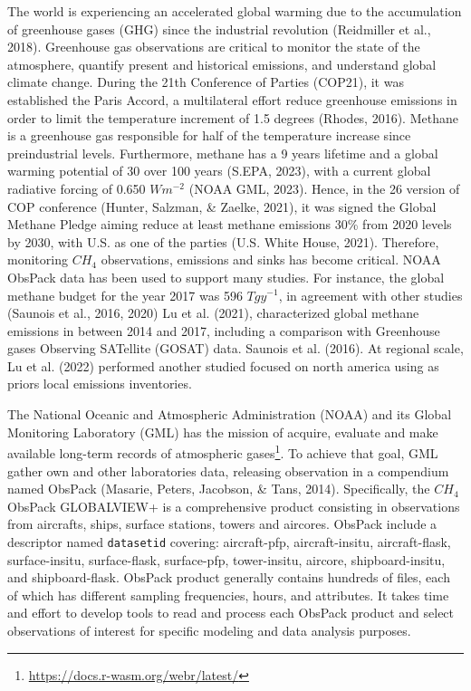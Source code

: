\documentclass[10pt,a4paper,onecolumn]{article}
\begin{document}
The world is experiencing an accelerated global warming due to the
accumulation of greenhouse gases (GHG) since the industrial revolution
(Reidmiller et al., 2018). Greenhouse gas observations are critical to
monitor the state of the atmosphere, quantify present and historical
emissions, and understand global climate change. During the 21th
Conference of Parties (COP21), it was established the Paris Accord, a
multilateral effort reduce greenhouse emissions in order to limit the
temperature increment of 1.5 degrees (Rhodes, 2016). Methane is a
greenhouse gas responsible for half of the temperature increase since
preindustrial levels. Furthermore, methane has a 9 years lifetime and a
global warming potential of 30 over 100 years (S.EPA, 2023), with a
current global radiative forcing of 0.650 \(Wm^{-2}\) (NOAA GML, 2023).
Hence, in the 26 version of COP conference (Hunter, Salzman, \& Zaelke,
2021), it was signed the Global Methane Pledge aiming reduce at least
methane emissions 30\% from 2020 levels by 2030, with U.S. as one of the
parties (U.S. White House, 2021). Therefore, monitoring \(CH_4\)
observations, emissions and sinks has become critical. NOAA ObsPack data
has been used to support many studies. For instance, the global methane
budget for the year 2017 was 596 \(Tgy^{-1}\), in agreement with other
studies (Saunois et al., 2016, 2020) Lu et al. (2021), characterized
global methane emissions in between 2014 and 2017, including a
comparison with Greenhouse gases Observing SATellite (GOSAT) data.
Saunois et al. (2016). At regional scale, Lu et al. (2022) performed
another studied focused on north america using as priors local emissions
inventories.

The National Oceanic and Atmospheric Administration (NOAA) and its
Global Monitoring Laboratory (GML) has the mission of acquire, evaluate
and make available long-term records of atmospheric gases\footnote{\url{https://docs.r-wasm.org/webr/latest/}}.
To achieve that goal, GML gather own and other laboratories data,
releasing observation in a compendium named ObsPack (Masarie, Peters,
Jacobson, \& Tans, 2014). Specifically, the \(CH_4\) ObsPack GLOBALVIEW+
is a comprehensive product consisting in observations from aircrafts,
ships, surface stations, towers and aircores. ObsPack include a
descriptor named \texttt{datasetid} covering: aircraft-pfp,
aircraft-insitu, aircraft-flask, surface-insitu, surface-flask,
surface-pfp, tower-insitu, aircore, shipboard-insitu, and
shipboard-flask. ObsPack product generally contains hundreds of files,
each of which has different sampling frequencies, hours, and attributes.
It takes time and effort to develop tools to read and process each
ObsPack product and select observations of interest for specific
modeling and data analysis purposes.
\end{document}
